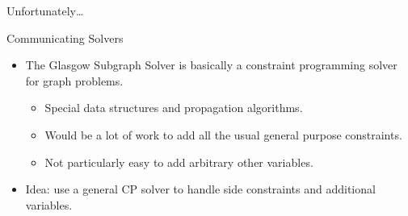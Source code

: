 \documentclass{beamer}
\begin{document}
\begin{frame}{Unfortunately\ldots}
\end{frame}

\begin{frame}{Communicating Solvers}
    \begin{itemize}
        \item The Glasgow Subgraph Solver is basically a constraint programming solver for graph problems.
            \begin{itemize}
                \item Special data structures and propagation algorithms.
                \item Would be a lot of work to add all the usual general purpose constraints.
                \item Not particularly easy to add arbitrary other variables.
            \end{itemize}
        \item Idea: use a general CP solver to handle side constraints and additional variables.
    \end{itemize}
\end{frame}
\end{document}
